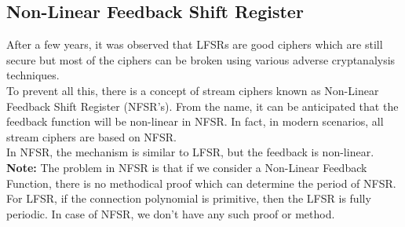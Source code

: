 \documentclass[11pt]{article}
\begin{document}
\subsection*{Non-Linear Feedback Shift Register}
After a few years, it was observed that LFSRs are good ciphers which are still secure but most of the ciphers can be broken using various adverse cryptanalysis techniques.\\
\newline
To prevent all this, there is a concept of stream ciphers known as Non-Linear Feedback Shift Register (NFSR's). From the name, it can be anticipated that the feedback function will be non-linear in NFSR. In fact, in modern scenarios, all stream ciphers are based on NFSR.\\
\newline
In NFSR, the mechanism is similar to LFSR, but the feedback is non-linear. \\
\textbf{Note: } The problem in NFSR is that if we consider a Non-Linear Feedback Function, there is no methodical proof which can determine the period of NFSR. For LFSR, if the connection polynomial is primitive, then the LFSR is fully periodic. In case of NFSR, we don't have any such proof or method.
\end{document}
